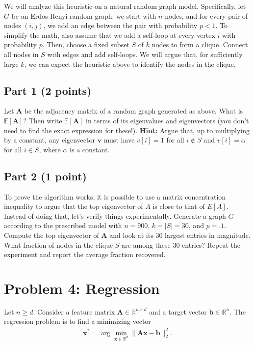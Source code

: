 \documentclass{article}
\begin{document}
We will analyze this heuristic on a natural random graph model. Specifically, let $G$ be an Erdos-Renyi random graph: we start with $n$ nodes, and for every pair of nodes $(i,j)$, we add an edge between the pair with probability $p < 1$. To simplify the math, also assume that we add a self-loop at every vertex $i$ with probability $p$. Then, choose a fixed subset $S$ of $k$ nodes to form a clique. Connect all nodes in $S$ with edges and add self-loops. We will argue that, for sufficiently large $k$, we can expect the heuristic above to identify the nodes in the clique. 

\subsection*{Part 1 (2 points)}
Let $\mathbf{A}$ be the adjacency matrix of a random graph generated as above.
What is $\mathbb{E}[\mathbf{A}]$?
Then write $\mathbb{E}[\mathbf{A}]$ in terms of its eigenvalues and eigenvectors (you don't need to find the exact expression for these!).
\textbf{Hint:} Argue that, up to multiplying by a constant, any eigenvector $\mathbf{v}$ must have $v[i] = 1$ for all $i \notin S$ and $v[i] = \alpha$ for all $i\in S$, where $\alpha$ is a constant.

\subsection*{Part 2 (1 point)}
To prove the algorithm works, it is possible to use a matrix concentration inequality to argue that the top eigenvector of $A$ is close to that of $E[A]$. Instead of doing that, let's verify things experimentally. Generate a graph $G$ according to the prescribed model with $n = 900$, $k = 
|S|= 30$, and $p = .1$. Compute the top eigenvector of $\mathbf{A}$ and look at its 30 largest
entries in magnitude. What fraction of nodes in the clique $S$ are among these 30 entries? Repeat the experiment and report the average fraction recovered. 

%

\newpage

\section*{Problem 4: Regression}

Let $n \geq d$.
Consider a feature matrix $\mathbf{A} \in \mathbb{R}^{n \times d}$ and a target vector $\mathbf{b} \in \mathbb{R}^n$.
The regression problem is to find a minimizing vector
\begin{align*}
\mathbf{x}^* = \arg \min_{\mathbf{x} \in \mathbb{R}^d}
\| \mathbf{Ax} - \mathbf{b} \|_2^2.
\end{align*}
\end{document}
